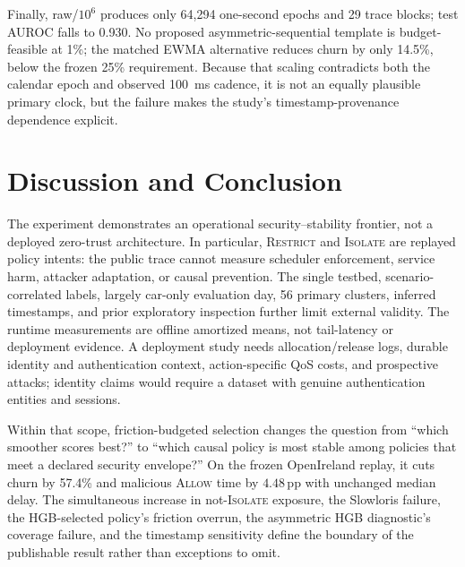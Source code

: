 \documentclass[journal,10pt]{IEEEtran}
\newcommand{\Allow}{\textsc{Allow}}
\newcommand{\Restrict}{\textsc{Restrict}}
\newcommand{\Isolate}{\textsc{Isolate}}
\newcommand{\pp}{\,\mathrm{pp}}
\begin{document}
Finally, raw/$10^6$ produces only 64,294 one-second epochs and 29 trace blocks; test AUROC falls to 0.930. No proposed asymmetric-sequential template is budget-feasible at 1\%; the matched EWMA alternative reduces churn by only 14.5\%, below the frozen 25\% requirement. Because that scaling contradicts both the calendar epoch and observed 100~ms cadence, it is not an equally plausible primary clock, but the failure makes the study's timestamp-provenance dependence explicit.

\section{Discussion and Conclusion}
The experiment demonstrates an operational security--stability frontier, not a deployed zero-trust architecture. In particular, \Restrict{} and \Isolate{} are replayed policy intents: the public trace cannot measure scheduler enforcement, service harm, attacker adaptation, or causal prevention. The single testbed, scenario-correlated labels, largely car-only evaluation day, 56 primary clusters, inferred timestamps, and prior exploratory inspection further limit external validity. The runtime measurements are offline amortized means, not tail-latency or deployment evidence. A deployment study needs allocation/release logs, durable identity and authentication context, action-specific QoS costs, and prospective attacks; identity claims would require a dataset with genuine authentication entities and sessions.

Within that scope, friction-budgeted selection changes the question from ``which smoother scores best?'' to ``which causal policy is most stable among policies that meet a declared security envelope?'' On the frozen OpenIreland replay, it cuts churn by 57.4\% and malicious \Allow{} time by $4.48\pp$ with unchanged median delay. The simultaneous increase in not-\Isolate{} exposure, the Slowloris failure, the HGB-selected policy's friction overrun, the asymmetric HGB diagnostic's coverage failure, and the timestamp sensitivity define the boundary of the publishable result rather than exceptions to omit.



\end{document}

